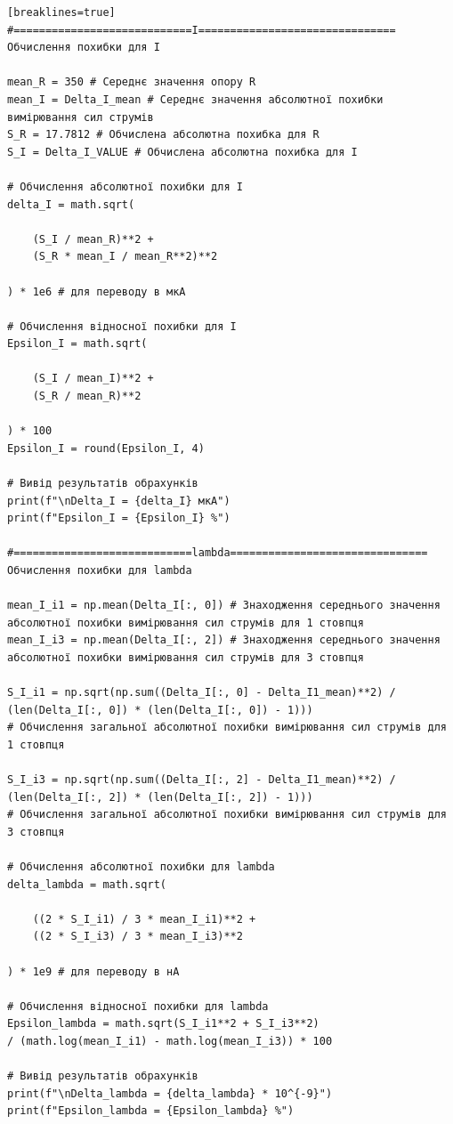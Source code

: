 \documentclass[12pt,a4paper]{article}
\begin{document}
{\begin{verbatim}[breaklines=true]
#============================I=============================== Обчислення похибки для I

mean_R = 350 # Середнє значення опору R
mean_I = Delta_I_mean # Середнє значення абсолютної похибки вимірювання сил струмів
S_R = 17.7812 # Обчислена абсолютна похибка для R
S_I = Delta_I_VALUE # Обчислена абсолютна похибка для I

# Обчислення абсолютної похибки для I
delta_I = math.sqrt(

    (S_I / mean_R)**2 +
    (S_R * mean_I / mean_R**2)**2

) * 1e6 # для переводу в мкА

# Обчислення відносної похибки для I
Epsilon_I = math.sqrt(

    (S_I / mean_I)**2 +
    (S_R / mean_R)**2

) * 100
Epsilon_I = round(Epsilon_I, 4)

# Вивід результатів обрахунків
print(f"\nDelta_I = {delta_I} мкА")
print(f"Epsilon_I = {Epsilon_I} %")

#============================lambda===============================
Обчислення похибки для lambda

mean_I_i1 = np.mean(Delta_I[:, 0]) # Знаходження середнього значення
абсолютної похибки вимірювання сил струмів для 1 стовпця
mean_I_i3 = np.mean(Delta_I[:, 2]) # Знаходження середнього значення
абсолютної похибки вимірювання сил струмів для 3 стовпця

S_I_i1 = np.sqrt(np.sum((Delta_I[:, 0] - Delta_I1_mean)**2) /
(len(Delta_I[:, 0]) * (len(Delta_I[:, 0]) - 1)))
# Обчислення загальної абсолютної похибки вимірювання сил струмів для 1 стовпця

S_I_i3 = np.sqrt(np.sum((Delta_I[:, 2] - Delta_I1_mean)**2) /
(len(Delta_I[:, 2]) * (len(Delta_I[:, 2]) - 1)))
# Обчислення загальної абсолютної похибки вимірювання сил струмів для 3 стовпця

# Обчислення абсолютної похибки для lambda
delta_lambda = math.sqrt(

    ((2 * S_I_i1) / 3 * mean_I_i1)**2 +
    ((2 * S_I_i3) / 3 * mean_I_i3)**2

) * 1e9 # для переводу в нА

# Обчислення відносної похибки для lambda
Epsilon_lambda = math.sqrt(S_I_i1**2 + S_I_i3**2)
/ (math.log(mean_I_i1) - math.log(mean_I_i3)) * 100

# Вивід результатів обрахунків
print(f"\nDelta_lambda = {delta_lambda} * 10^{-9}")
print(f"Epsilon_lambda = {Epsilon_lambda} %")
    \end{verbatim}
    }
\end{document}
